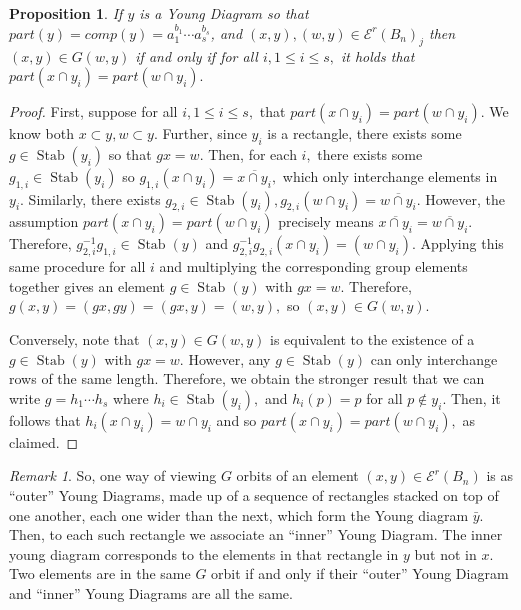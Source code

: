 \documentclass[10 pt]{amsart}
\theoremstyle{plain}
\newtheorem{prop}[thm]{Proposition}
\theoremstyle{definition}
\theoremstyle{remark}
\newtheorem{rem}[thm]{Remark}
\numberwithin{equation}{section}
\def\Stab{\operatorname{Stab}}
\begin{document}
\begin{prop}
\label{prop:wreath_orbits}
If $y$ is a Young Diagram so that $part(y) = comp(y) =a_1^{b_1}\cdots a_s^{b_s}$, and $(x, y), (w, y) \in\mathcal E^r(B_n)_j$ then $(x, y) \in G(w, y)$ if and only if for all $i,1 \leq i \leq s,$ it holds that $part(x\cap y_i) = part(w \cap y_i).$
\end{prop}
\begin{proof}
First, suppose for all $i,1 \leq i \leq s,$ that $part(x\cap y_i) = part(w\cap y_i).$ We know both $x\subset y, w \subset y$. Further, since $y_i$ is a rectangle, there exists some $g \in \Stab(y_i)$ so that $gx = w.$ Then, for each $i,$ there exists some $g_{1,i} \in \Stab(y_i)$ so $g_{1,i}(x \cap y_i)=\overline{x \cap y_i},$ which only interchange elements in $y_i.$ Similarly, there exists $g_{2,i} \in \Stab(y_i),g_{2,i}(w \cap y_i) = \overline{w\cap y_i}.$ However, the assumption $part(x\cap y_i) = part(w\cap y_i)$ precisely means $\overline{x \cap y_i}= \overline{w\cap y_i}.$ Therefore, $g_{2,i}^{-1}g_{1,i} \in \Stab(y)$ and $g_{2,i}^{-1}g_{2,i}(x \cap y_i) = (w \cap y_i).$ Applying this same procedure for all $i$ and multiplying the corresponding group elements together gives an element $g \in \Stab(y)$ with $gx = w.$ Therefore, $g(x, y) = (gx, gy) = (gx, y) = (w, y),$ so $(x, y) \in G(w, y).$

Conversely, note that $(x, y) \in G(w, y)$ is equivalent to the existence of a $g \in \Stab(y)$ with $gx = w.$ However, any $g \in \Stab(y)$ can only interchange rows of the same length. Therefore, we obtain the stronger result that we can write $g = h_1 \cdots h_s$ where $h_i \in \Stab(y_i),$ and $h_i(p) = p$ for all $p \notin y_i.$ Then, it follows that $h_i(x \cap y_i) = w \cap y_i$ and so $part(x\cap y_i) = part(w\cap y_i),$ as claimed.
\end{proof}

\begin{rem}
So, one way of viewing $G$ orbits of an element $(x, y) \in \mathcal E^r(B_n)$ is as ``outer'' Young Diagrams, made up of a sequence of rectangles stacked on top of one another, each one wider than the next, which form the Young diagram $\bar y.$ Then, to each such rectangle we associate an ``inner'' Young Diagram. The inner young diagram corresponds to the elements in that rectangle in $y$ but not in $x.$ Two elements are in the same $G$ orbit if and only if their ``outer'' Young Diagram and ``inner'' Young Diagrams are all the same.
\end{rem}
\end{document}
